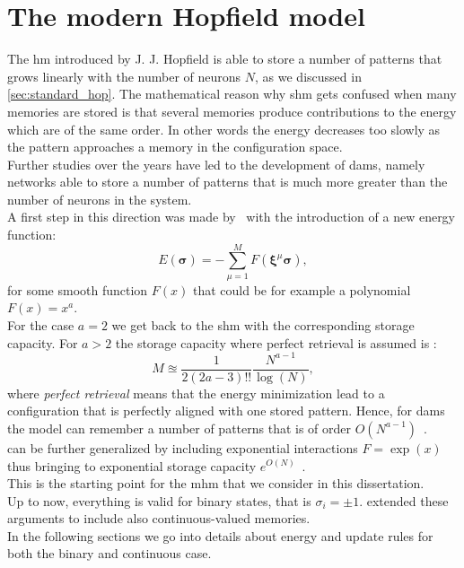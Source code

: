 \documentclass[\rootdir/main.tex]{subfiles}
\begin{document}
\section{The modern Hopfield model}\label{sec:modern_hop}
The \acrlong{hm} introduced by J. J. Hopfield is able to store a number of patterns that grows linearly with the number of neurons $N$, as we discussed in \cref{sec:standard_hop}. The mathematical reason why \acrlong{shm} gets confused when many memories are stored is that several memories produce contributions to the energy which are of the same order. In other words the energy decreases too slowly as the pattern approaches a memory in the configuration space.\\
Further studies over the years have led to the development of \glspl{dam}, namely networks able to store a number of patterns that is much more greater than the number of neurons in the system.\\
A first step in this direction was made by~\textcite{krotov} with the introduction of a new energy function:
\begin{equation}\label{eq:dense_energy}
    E\left(\symbf{\sigma}\right) = - \sum_{\mu = 1}^{M} F(\symbf{\xi}^{\mu} \symbf{\sigma}),
\end{equation}
for some smooth function $F(x)$ that could be for example a polynomial $F(x) = x^a$.\\
For the case $a = 2$ we get back to the \acrlong{shm} with the corresponding storage capacity. For $ a > 2$ the storage capacity where perfect retrieval is assumed is \cite{krotov}:
\begin{equation}
    M \approxeq \frac{1}{2 (2a -3)!!} \frac{N^{a - 1}}{\operatorname{log}(N)},
\end{equation}
where \emph{perfect retrieval} means that the energy minimization lead to a configuration that is perfectly aligned with one stored pattern. Hence, for \glspl{dam} the model can remember a number of patterns that is of order $O(N^{a - 1})$~\cite{Demircigil_2017}.\\
 can be further generalized by including exponential interactions $F = \operatorname{exp}(x)$ thus bringing to exponential storage capacity $e^{O(N)}$~\cite{EGardner_1987}.\\
This is the starting point for the \acrfull{mhm} that we consider in this dissertation.\\
Up to now, everything is valid for binary states, that is $\sigma_i = \pm 1$. \textcite{hopfield_is_all_you_need} extended these arguments to include also continuous-valued memories.\\
In the following sections we go into details about energy and update rules for both the binary and continuous case.
\end{document}
